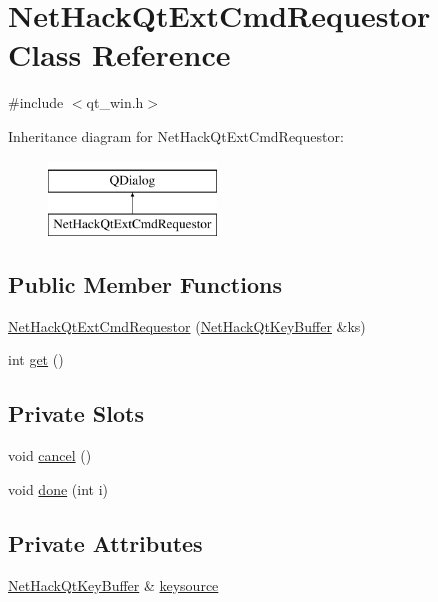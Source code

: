 \hypertarget{classNetHackQtExtCmdRequestor}{\section{Net\+Hack\+Qt\+Ext\+Cmd\+Requestor Class Reference}
\label{classNetHackQtExtCmdRequestor}
}


{\ttfamily \#include $<$qt\+\_\+win.\+h$>$}

Inheritance diagram for Net\+Hack\+Qt\+Ext\+Cmd\+Requestor\+:\begin{figure}[H]
\begin{center}
\leavevmode
\includegraphics[height=2.000000cm]{classNetHackQtExtCmdRequestor}
\end{center}
\end{figure}
\subsection*{Public Member Functions}
\begin{DoxyCompactItemize}
\item 
\hyperlink{classNetHackQtExtCmdRequestor_ad6c9ed5b410cf3ce6e17cf96c4e54dfb}{Net\+Hack\+Qt\+Ext\+Cmd\+Requestor} (\hyperlink{classNetHackQtKeyBuffer}{Net\+Hack\+Qt\+Key\+Buffer} \&ks)
\item 
int \hyperlink{classNetHackQtExtCmdRequestor_a28772d11e9e24335439413b62e4e4a3d}{get} ()
\end{DoxyCompactItemize}
\subsection*{Private Slots}
\begin{DoxyCompactItemize}
\item 
void \hyperlink{classNetHackQtExtCmdRequestor_af687ad5530a1ebb3d76558885cafa2d7}{cancel} ()
\item 
void \hyperlink{classNetHackQtExtCmdRequestor_a3657c2d6f45319181ffae8aa67fbd0bb}{done} (int i)
\end{DoxyCompactItemize}
\subsection*{Private Attributes}
\begin{DoxyCompactItemize}
\item 
\hyperlink{classNetHackQtKeyBuffer}{Net\+Hack\+Qt\+Key\+Buffer} \& \hyperlink{classNetHackQtExtCmdRequestor_afb1ec408c71ea57a1b65315a32816258}{keysource}
\end{DoxyCompactItemize}


